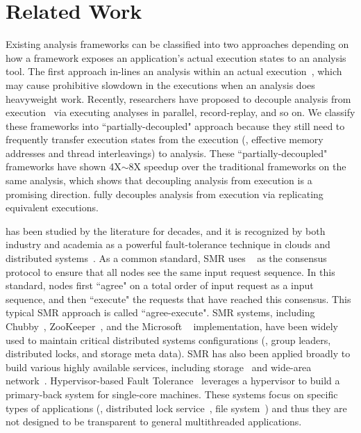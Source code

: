 \section{Related Work} \label{sec:related}

Existing analysis frameworks can be classified into two approaches depending 
on how a framework exposes an application's actual execution states to an 
analysis tool. The first approach in-lines an analysis within an 
actual execution~\cite{dynamorio, pin:pldi05, 
valgrind:pldi, lift:micro06, tsan}, which may cause prohibitive slowdown in the
executions when an analysis does heavyweight work. Recently, researchers have
proposed to 
decouple analysis from execution~\cite{decouple:usenix08, speck:asplos08, 
shadowreplica:ccs13, wester:parallelizing:asplos13, superpin, jungwoo:oopsla09} 
via executing analyses in parallel, record-replay, and so on. We classify these
frameworks into ``partially-decoupled" approach because they still need to
frequently 
transfer execution states from the execution (\eg, effective memory addresses 
and thread interleavings) to analysis. These ``partially-decoupled" frameworks 
have shown 4X$\sim$8X speedup over the traditional frameworks on the same 
analysis, which shows that decoupling analysis from execution is a promising 
direction. \xxx fully decouples analysis from execution via replicating 
equivalent executions.

\smr has been studied by the literature for decades, and it is recognized by 
both industry and academia as a powerful fault-tolerance technique in clouds 
and distributed systems~\cite{lamportclock, smr:tutorial}. As a common 
standard, SMR uses \paxos~\cite{paxos} as the consensus protocol to ensure that 
all nodes see the same input request sequence. In this standard, nodes first 
``agree" on a total order of input request as a input sequence, and then 
``execute" the requests that have reached this consensus. This typical SMR 
approach is called ``agree-execute". SMR systems, including 
Chubby~\cite{chubby:osdi}, ZooKeeper~\cite{zookeeper}, and 
the Microsoft \paxos~\cite{paxos} implementation, have been widely used to 
maintain critical distributed systems configurations (\eg, group leaders, 
distributed locks, and storage meta data). SMR has also been applied broadly to 
build various highly available services, including 
storage~\cite{paxos:datastore} and wide-area network~\cite{mencius:osdi08}. 
Hypervisor-based Fault Tolerance~\cite{hft:sosp95} leverages a hypervisor to 
build a primary-back system for single-core machines. These systems focus on 
specific types of applications (\eg, distributed lock 
service~\cite{chubby:osdi}, file system~\cite{zookeeper}) and thus they are not 
designed to be transparent to general multithreaded applications.

